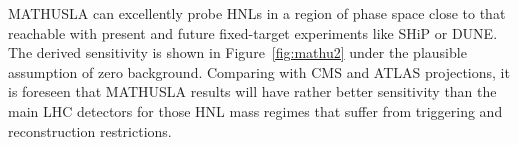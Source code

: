 MATHUSLA can excellently probe HNLs in a region of phase space close to that reachable
with present and future fixed-target experiments like SHiP or
DUNE. The derived sensitivity is shown in Figure~\ref{fig:mathu2} under
the plausible assumption of zero background. Comparing with CMS and
ATLAS projections, it is foreseen that MATHUSLA results will have rather
better sensitivity than the main LHC detectors for those HNL mass
regimes that suffer from triggering and reconstruction restrictions.



